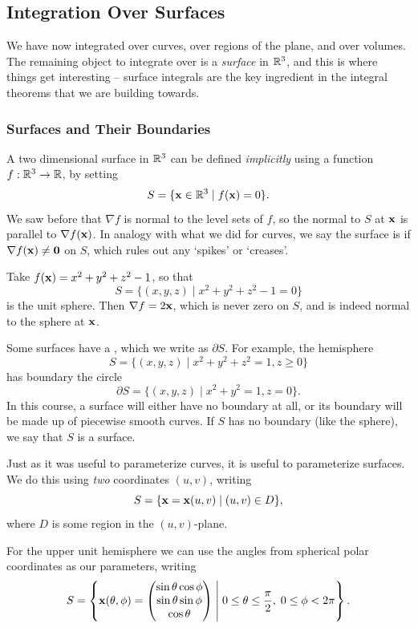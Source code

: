 \documentclass[a4paper]{scrartcl}
\begin{document}
\subsection{Integration Over Surfaces}

We have now integrated over curves, over regions of the plane, and over volumes. The remaining object to integrate over is a \emph{surface} in $\mathbb{R}^3$, and this is where things get interesting -- surface integrals are the key ingredient in the integral theorems that we are building towards.

\subsubsection{Surfaces and Their Boundaries}

A two dimensional surface in $\mathbb{R}^3$ can be defined \emph{implicitly} using a function $f : \mathbb{R}^3 \rightarrow \mathbb{R}$, by setting
$$
S = \{\mathbf{x} \in \mathbb{R}^3 \mid f(\mathbf{x}) = 0\}.
$$
We saw before that $\nabla f$ is normal to the level sets of $f$, so the normal to $S$ at $\mathbf{x}$ is parallel to $\nabla f(\mathbf{x})$. In analogy with what we did for curves, we say the surface is  if $\nabla f(\mathbf{x}) \neq \mathbf{0}$ on $S$, which rules out any `spikes' or `creases'.

\begin{example}
	Take $f(\mathbf{x}) = x^2 + y^2 + z^2 - 1$, so that
	$$
	S = \{(x, y, z) \mid x^2 + y^2 + z^2 - 1 = 0\}
	$$
	is the unit sphere. Then $\nabla f = 2 \mathbf{x}$, which is never zero on $S$, and is indeed normal to the sphere at $\mathbf{x}$.
\end{example}

Some surfaces have a , which we write as $\partial S$. For example, the hemisphere
$$
S = \{(x, y, z) \mid x^2 + y^2 + z^2 = 1, z \geq 0\}
$$
has boundary the circle
$$
\partial S = \{(x, y, z) \mid x^2 + y^2 = 1, z = 0\}.
$$
In this course, a surface will either have no boundary at all, or its boundary will be made up of piecewise smooth curves. If $S$ has no boundary (like the sphere), we say that $S$ is a  surface.

Just as it was useful to parameterize curves, it is useful to parameterize surfaces. We do this using \emph{two} coordinates $(u, v)$, writing
$$
S = \{\mathbf{x} = \mathbf{x}(u, v) \mid (u, v) \in D\},
$$
where $D$ is some region in the $(u, v)$-plane.

\begin{example}
	For the upper unit hemisphere we can use the angles from spherical polar coordinates as our parameters, writing
	$$
	S = \left\{\mathbf{x}(\theta, \phi) = \begin{pmatrix}
		\sin \theta \cos \phi \\
		\sin \theta \sin \phi \\
		\cos \theta
	\end{pmatrix} \;\middle|\; 0 \leq \theta \leq \frac{\pi}{2}, \; 0 \leq \phi < 2 \pi\right\}.
	$$
\end{example}
\end{document}
